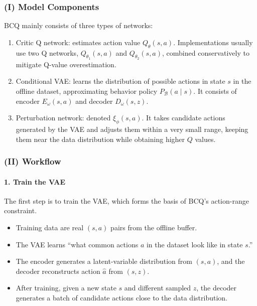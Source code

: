 \hypertarget{i-model-components}{%
\subsubsection{(I) Model Components}\label{i-model-components}}

BCQ mainly consists of three types of networks:

\begin{enumerate}
\def\labelenumi{\arabic{enumi}.}
\tightlist
\item
  Critic Q network: estimates action value \(Q_\theta(s,a)\). Implementations usually use two Q networks, \(Q_{\theta_1}(s,a)\) and \(Q_{\theta_2}(s,a)\), combined conservatively to mitigate Q-value overestimation.
\item
  Conditional VAE: learns the distribution of possible actions in state \(s\) in the offline dataset, approximating behavior policy \(P_{\mathcal B}(a \mid s)\). It consists of encoder \(E_\omega(s,a)\) and decoder \(D_\omega(s,z)\).
\item
  Perturbation network: denoted \(\xi_\phi(s,a)\). It takes candidate actions generated by the VAE and adjusts them within a very small range, keeping them near the data distribution while obtaining higher \(Q\) values.
\end{enumerate}

\hypertarget{ii-workflow}{%
\subsubsection{(II) Workflow}\label{ii-workflow}}

\hypertarget{train-the-vae}{%
\paragraph{1. Train the VAE}\label{train-the-vae}}

The first step is to train the VAE, which forms the basis of BCQ's action-range constraint.

\begin{itemize}
\tightlist
\item
  Training data are real \((s,a)\) pairs from the offline buffer.
\item
  The VAE learns ``what common actions \(a\) in the dataset look like in state \(s\).''
\item
  The encoder generates a latent-variable distribution from \((s,a)\), and the decoder reconstructs action \(\hat{a}\) from \((s,z)\).
\item
  After training, given a new state \(s\) and different sampled \(z\), the decoder generates a batch of candidate actions close to the data distribution.
\end{itemize}

